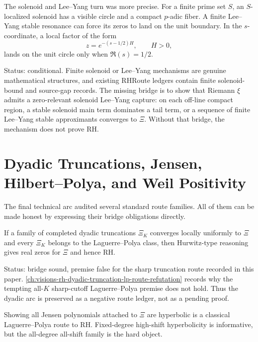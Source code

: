 The solenoid and Lee--Yang turn was more precise.  For a finite prime set
$S$, an $S$-localized solenoid has a visible circle and a compact
$p$-adic fiber.  A finite Lee--Yang stable resonance can force its zeros to
land on the unit boundary.  In the $s$-coordinate, a local factor of the
form
$$
z=e^{-(s-1/2)H},
\qquad H>0,
$$
lands on the unit circle only when $\Re(s)=1/2$.

Status: conditional.  Finite solenoid or Lee--Yang mechanisms are genuine
mathematical structures, and existing RHRoute ledgers contain finite
solenoid-bound and source-gap records.  The missing bridge is to show that
Riemann $\xi$ admits a zero-relevant solenoid Lee--Yang capture:
on each off-line compact region, a stable solenoid main term dominates a
tail term, or a sequence of finite Lee--Yang stable approximants converges
to $\Xi$.  Without that bridge, the mechanism does not prove RH.

\section{Dyadic Truncations, Jensen, Hilbert--Polya, and Weil Positivity}
\label{sec:rh-ledger-classical-route-audit}

The final technical arc audited several standard route families.
All of them can be made honest by expressing their bridge obligations
directly.

\begin{principle}
\label{prin:rh-ledger-dyadic-lp-bridge}
If a family of completed dyadic truncations $\Xi_K$ converges locally
uniformly to $\Xi$ and every $\Xi_K$ belongs to the
Laguerre--Polya class, then Hurwitz-type reasoning gives real zeros for
$\Xi$ and hence RH.
\end{principle}

Status: bridge sound, premise false for the sharp truncation route recorded
in this paper.  \autoref{ch:visions-rh-dyadic-truncation-lp-route-refutation}
records why the tempting all-$K$ sharp-cutoff Laguerre--Polya premise does
not hold.  Thus the dyadic arc is preserved as a negative route ledger, not
as a pending proof.

\begin{principle}
\label{prin:rh-ledger-jensen-lp-audit}
Showing all Jensen polynomials attached to $\Xi$ are hyperbolic is a
classical Laguerre--Polya route to RH.  Fixed-degree high-shift
hyperbolicity is informative, but the all-degree all-shift family is the
hard object.
\end{principle}

